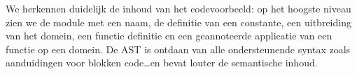 We herkennen duidelijk de inhoud van het codevoorbeeld: op het hoogste niveau
zien we de module met een naam, de definitie van een constante, een uitbreiding
van het domein, een functie definitie en een geannoteerde applicatie van een
functie op een domein. De AST is ontdaan van alle ondersteunende syntax zoals
aanduidingen voor blokken code\dots en bevat louter de semantische inhoud.
